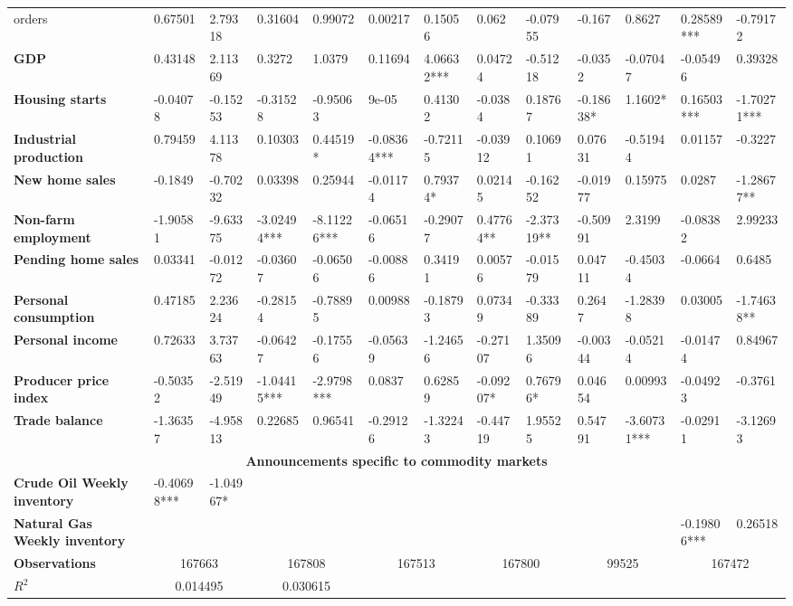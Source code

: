 \begin{sidewaystable}
{\begin{tabular}{@{}lllllllllllll@{}}
orders}& 0.67501 & 2.79318 & 0.31604 & 0.99072 & 0.00217 & 0.15056 & 0.062 & -0.07955 & -0.167 & 0.8627 & 0.28589*** & -0.79172 \\ \textbf{GDP}& 0.43148 & 2.11369 & 0.3272 & 1.0379 & 0.11694 & 4.06632*** & 0.04724 & -0.51218 & -0.0352 & -0.07047 & -0.05496 & 0.39328 \\ \textbf{Housing starts}& -0.04078 & -0.15253 & -0.31528 & -0.95063 & 9e-05 & 0.41302 & -0.0384 & 0.18767 & -0.18638* & 1.1602* & 0.16503*** & -1.70271*** \\ \textbf{Industrial production}& 0.79459 & 4.11378 & 0.10303 & 0.44519* & -0.08364*** & -0.72115 & -0.03912 & 0.10691 & 0.07631 & -0.51944 & 0.01157 & -0.3227 \\ \textbf{New home sales}& -0.1849 & -0.70232 & 0.03398 & 0.25944 & -0.01174 & 0.79374* & 0.02145 & -0.16252 & -0.01977 & 0.15975 & 0.0287 & -1.28677** \\ \textbf{Non-farm employment}& -1.90581 & -9.63375 & -3.02494*** & -8.11226*** & -0.06516 & -0.29077 & 0.47764** & -2.37319** & -0.50991 & 2.3199 & -0.08382 & 2.99233 \\ \textbf{Pending home sales}& 0.03341 & -0.01272 & -0.03607 & -0.06506 & -0.00886 & 0.34191 & 0.00576 & -0.01579 & 0.04711 & -0.45034 & -0.0664 & 0.6485 \\ \textbf{Personal consumption}& 0.47185 & 2.23624 & -0.28154 & -0.78895 & 0.00988 & -0.18793 & 0.07349 & -0.33389 & 0.2647 & -1.28398 & 0.03005 & -1.74638** \\ \textbf{Personal income}& 0.72633 & 3.73763 & -0.06427 & -0.17556 & -0.05639 & -1.24656 & -0.27107 & 1.35096 & -0.00344 & -0.05214 & -0.01474 & 0.84967 \\ \textbf{Producer price index}& -0.50352 & -2.51949 & -1.04415***& -2.9798***& 0.0837 & 0.62859 & -0.09207* & 0.76796* & 0.04654 & 0.00993 & -0.04923 & -0.3761 \\ \textbf{Trade balance}& -1.36357 & -4.95813 & 0.22685 & 0.96541 & -0.29126 & -1.32243 & -0.44719 & 1.95525 & 0.54791 & -3.60731*** & -0.02911 & -3.12693 \\  \midrule \multicolumn{13}{c}{\textbf{Announcements specific to commodity markets}} \\ \midrule \textbf{Crude Oil Weekly inventory}& -0.40698*** & -1.04967* &  &  &  &  &  &  &  &  &  &  \\ \textbf{Natural Gas Weekly inventory}&  &  &  &  &  &  &  &  &  &  & -0.19806*** & 0.26518 \\  \midrule \textbf{Observations}             &\multicolumn{2}{c}{ 167663 }                                                 & \multicolumn{2}{c}{ 167808 }                                                 & \multicolumn{2}{c}{ 167513 }                                                 & \multicolumn{2}{c}{ 167800 }                                                 & \multicolumn{2}{c}{ 99525 }                                                   & \multicolumn{2}{c}{ 167472 }                                                 \\ \textbf{$R^2$}             &\multicolumn{2}{c}{ 0.014495 }                                                 & \multicolumn{2}{c}{ 0.030615 }                 
\end{tabular}}
\end{sidewaystable}

